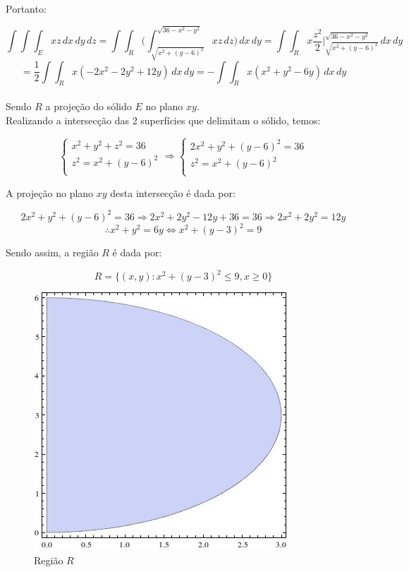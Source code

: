 \documentclass[12pt,a4paper]{article}
\begin{document}
Portanto:

$$ \int \int \int_E xz \,dx \,dy \,dz =  \int \int_R \Big( \int_{ \sqrt{x^2 + (y-6)^2} }^{ \sqrt{36 - x^2 - y^2} } xz \,dz \Big) \,dx \,dy = \int \int_R x \frac{z^2}{2} \Big|_{ \sqrt{x^2 + (y-6)^2} }^{ \sqrt{36 - x^2 - y^2} } \,dx \,dy  $$
$$ = \frac{1}{2} \int \int_R x (-2x^2 - 2y^2 + 12y) \,dx \,dy = - \int \int_R x (x^2 + y^2 - 6y) \,dx \,dy $$ \\

Sendo $R$ a projeção do sólido $E$ no plano $xy$. \\

Realizando a intersecção das 2 superfícies que delimitam o sólido, temos:

$$
\left\{
\begin{array}{lc}
x^2 + y^2 + z^2 = 36\\
z^2 = x^2 + (y-6)^2 \\
\end{array}
\right. \Rightarrow
\left\{
\begin{array}{lc}
2x^2 + y^2 + (y-6)^2 = 36\\
z^2 = x^2 + (y-6)^2 \\
\end{array}
\right.
$$

A projeção no plano $xy$ desta intersecção é dada por:

$$ 2x^2 + y^2 + (y-6)^2 = 36 \Rightarrow 2x^2 + 2y^2 -12y + 36 = 36 \Rightarrow 2x^2 + 2y^2 = 12y $$
$$   \therefore x^2 + y^2 = 6y \Leftrightarrow x^2 + (y-3)^2 = 9 $$

Sendo assim, a região $R$ é dada por:

$$ R = \{ (x,y): x^2 + (y-3)^2  \leq 9 , x \geq 0 \} $$

\begin{figure}[h!]
	\centering
	\includegraphics[scale=0.5]{Q2bA.jpg}  
	\caption{Região $R$}
	\label{fig:figura5}
\end{figure}
\end{document}
